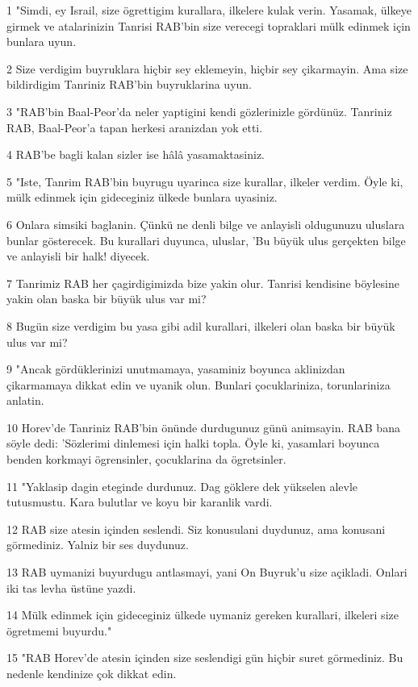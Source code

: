 \par 1 "Simdi, ey Israil, size ögrettigim kurallara, ilkelere kulak verin. Yasamak, ülkeye girmek ve atalarinizin Tanrisi RAB'bin size verecegi topraklari mülk edinmek için bunlara uyun.
\par 2 Size verdigim buyruklara hiçbir sey eklemeyin, hiçbir sey çikarmayin. Ama size bildirdigim Tanriniz RAB'bin buyruklarina uyun.
\par 3 "RAB'bin Baal-Peor'da neler yaptigini kendi gözlerinizle gördünüz. Tanriniz RAB, Baal-Peor'a tapan herkesi aranizdan yok etti.
\par 4 RAB'be bagli kalan sizler ise hâlâ yasamaktasiniz.
\par 5 "Iste, Tanrim RAB'bin buyrugu uyarinca size kurallar, ilkeler verdim. Öyle ki, mülk edinmek için gideceginiz ülkede bunlara uyasiniz.
\par 6 Onlara simsiki baglanin. Çünkü ne denli bilge ve anlayisli oldugunuzu uluslara bunlar gösterecek. Bu kurallari duyunca, uluslar, 'Bu büyük ulus gerçekten bilge ve anlayisli bir halk! diyecek.
\par 7 Tanrimiz RAB her çagirdigimizda bize yakin olur. Tanrisi kendisine böylesine yakin olan baska bir büyük ulus var mi?
\par 8 Bugün size verdigim bu yasa gibi adil kurallari, ilkeleri olan baska bir büyük ulus var mi?
\par 9 "Ancak gördüklerinizi unutmamaya, yasaminiz boyunca aklinizdan çikarmamaya dikkat edin ve uyanik olun. Bunlari çocuklariniza, torunlariniza anlatin.
\par 10 Horev'de Tanriniz RAB'bin önünde durdugunuz günü animsayin. RAB bana söyle dedi: 'Sözlerimi dinlemesi için halki topla. Öyle ki, yasamlari boyunca benden korkmayi ögrensinler, çocuklarina da ögretsinler.
\par 11 "Yaklasip dagin eteginde durdunuz. Dag göklere dek yükselen alevle tutusmustu. Kara bulutlar ve koyu bir karanlik vardi.
\par 12 RAB size atesin içinden seslendi. Siz konusulani duydunuz, ama konusani görmediniz. Yalniz bir ses duydunuz.
\par 13 RAB uymanizi buyurdugu antlasmayi, yani On Buyruk'u size açikladi. Onlari iki tas levha üstüne yazdi.
\par 14 Mülk edinmek için gideceginiz ülkede uymaniz gereken kurallari, ilkeleri size ögretmemi buyurdu."
\par 15 "RAB Horev'de atesin içinden size seslendigi gün hiçbir suret görmediniz. Bu nedenle kendinize çok dikkat edin.
